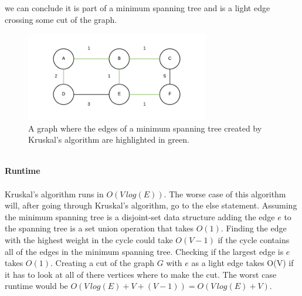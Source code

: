 \documentclass[12pt]{article}
\begin{document}
\begin{enumerate}
	we can conclude it is part of a minimum spanning tree and is a light edge crossing some cut of the graph.\\
	\begin{figure}[h]
	\caption{A graph where the edges of a minimum spanning tree created by Kruskal's algorithm are highlighted in green.}
	\includegraphics[width=8cm]{ps2_q3.png}
	\centering
	\end{figure}
	\\
	\textbf{Runtime}\\
	\\
	Kruskal's algorithm runs in $O(V\,log(E))$.  The worse case of this algorithm will, after going through Kruskal's algorithm, go to the else statement.
	Assuming the minimum spanning tree is a disjoint-set data structure adding the edge $e$ to the spanning tree is a set union operation that takes $O(1)$.
	Finding the edge with the highest weight in the cycle could take $O(V-1)$ if the cycle contains all of the edges in the minimum spanning tree.
	Checking if the largest edge is $e$ takes $O(1)$.  
	Creating a cut of the graph $G$ with $e$ as a light edge takes O(V) if it has to look at all of there vertices where to make the cut.
	The worst case runtime would be $O(V\,log(E)+V+(V-1)) = O(V\,log(E) + V)$.\\
	

\end{enumerate}
\end{document}
